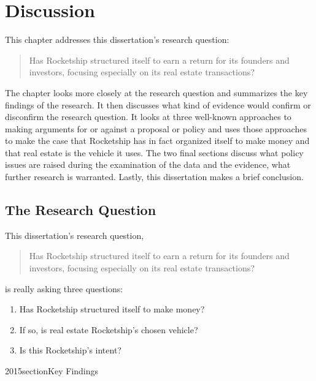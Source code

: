 
\chapter{Discussion}%
\label{ch:discussion}%
\noindent\bigskip%

This chapter addresses this dissertation's research question:
\medskip%
\begin{quote}\OnehalfSpacing
  Has Rocketship structured itself to earn a return for its founders and investors, focusing especially on its real estate transactions?
\end{quote}
The chapter looks more closely at the research question and summarizes the key findings of the research. It then discusses what kind of evidence would confirm or disconfirm the research question. It looks at three well-known approaches to making arguments for or against a proposal or policy and uses those approaches to make the case that Rocketship has in fact organized itself to make money and that real estate is the vehicle it uses. The two final sections discuss what policy issues are raised during the examination of the data and the evidence, what further research is warranted. Lastly, this dissertation makes a brief conclusion.

\section{The Research Question}%
\label{sec:research-question}\indent%

This dissertation's research question,
\begin{quote}\OnehalfSpacing
  Has Rocketship structured itself to earn a return for its founders and investors, focusing especially on its real estate transactions?
\end{quote}
is really asking three questions:
\begin{enumerate}
  \item Has Rocketship structured itself to make money?
  \item If so, is real estate Rocketship's chosen vehicle?
  \item Is this Rocketship's intent?
\end{enumerate}

2015section{Key Findings}%
\label{sec:summary-key-findings}\indent%

